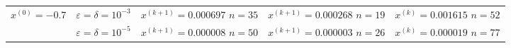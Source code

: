 \begin{table}[h!]
\begin{tabular}{|p{12ex}|l|p{20ex}|p{20ex}|p{20ex}|}
		\(x^{(0)} = -0.7\)                       &                                                                                                               %
		\(\varepsilon = \delta = 10^{-3} \)      &                                                                                                               %
		\(x^{(k+1)}=0.000697\) \newline \(n=35\) &                                                                                                               %
		\(x^{(k+1)}=0.000268\) \newline \(n=19\) &                                                                                                               %
		\(x^{(k)}=0.001615\) \newline \(n=52\)                                                                                                                   \\ \cline{2-5}
		                                         & \(\varepsilon = \delta = 10^{-5} \) &                                                                         %
		\(x^{(k+1)}=0.000008\) \newline \(n=50\) &                                                                                                               %
		\(x^{(k+1)}=0.000003\) \newline \(n=26\) &                                                                                                               %
		\(x^{(k)}=0.000019\) \newline \(n=77\)                                                                                                                   \\ \hline


\end{tabular}
\end{table}
